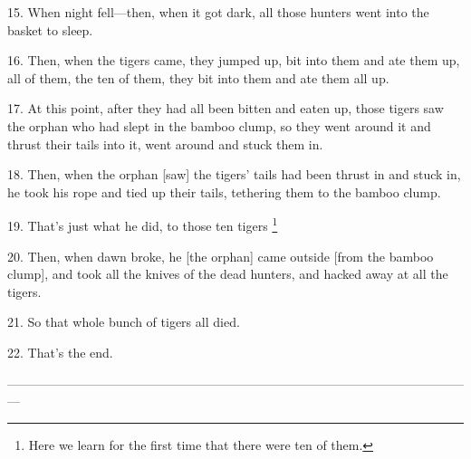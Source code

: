 15. When night fell---then, when it got dark, all those hunters went into the basket
to sleep.

16. Then, when the tigers came, they jumped up, bit into them and ate them up,
all of them, the ten of them, they bit into them and ate them all up.

17. At this point, after they had all been bitten and eaten up, those tigers saw
the orphan who had slept in the bamboo clump, so they went around it and thrust
their tails into it, went around and stuck them in.

18. Then, when the orphan [saw] the tigers' tails had been thrust in and stuck
in, he took his rope and tied up their tails, tethering them to the bamboo clump.

19. That's just what he did, to those ten tigers \.\footnote{Here we learn for the first time that there were ten of them.}

20. Then, when dawn broke, he [the orphan] came outside [from the bamboo clump],
and took all the knives of the dead hunters, and hacked away at all the tigers.

21. So that whole bunch of tigers all died.

22. That's the end.

---------------------------------------------------------------------------------------------------------------

